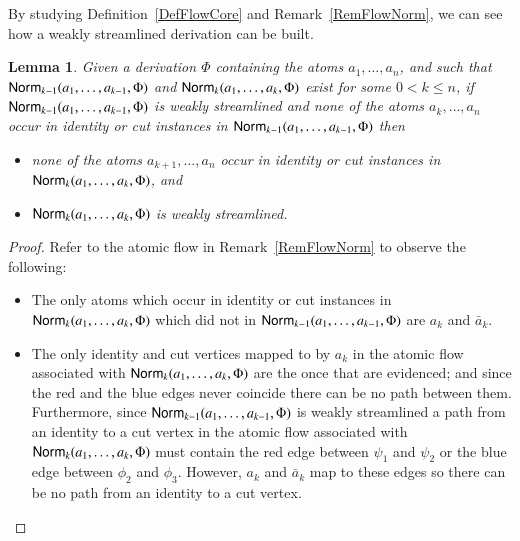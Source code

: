 \documentclass[a4paper]{amsart}
\renewcommand{\le}{\leqslant}
\newtheorem{lemma}[theorem]{Lemma}
\theoremstyle{definition}
\theoremstyle{remark}
\begin{document}

By studying Definition~\ref{DefFlowCore} and Remark~\ref{RemFlowNorm}, we can see how a weakly streamlined derivation can be built.


\begin{lemma}\label{LemStreamlinedNorm}
Given a derivation $\Phi$ containing the atoms $a_1,\dots,a_n$, and such that\/ $\mathsf{Norm}_{k-1}(a_1,\dots,a_{k-1},\Phi)$ and\/ $\mathsf{Norm}_k(a_1,\dots,a_k,\Phi)$ exist for some $0<k\le n$, if\/ $\mathsf{Norm}_{k-1}(a_1,\dots,a_{k-1},\Phi)$ is weakly streamlined and none of the atoms $a_k,\dots,a_n$ occur in identity or cut instances in\/ $\mathsf{Norm}_{k-1}(a_1,\dots,a_{k-1},\Phi)$ then
\begin{itemize}
 \item none of the atoms $a_{k+1},\dots,a_n$ occur in identity or cut instances in $\mathsf{Norm}_k(a_1,\dots,a_k,\Phi)$, and
 \item $\mathsf{Norm}_k(a_1,\dots,a_k,\Phi)$ is weakly streamlined.
\end{itemize}
\end{lemma}

\begin{proof}
Refer to the atomic flow in Remark~\ref{RemFlowNorm} to observe the following:
\begin{itemize}
 \item The only atoms which occur in identity or cut instances in $\mathsf{Norm}_k(a_1,\dots,a_k,\Phi)$ which did not in $\mathsf{Norm}_{k-1}(a_1,\dots,a_{k-1},\Phi)$ are $a_k$ and $\bar a_k$.
 \item The only identity and cut vertices mapped to by $a_k$ in the atomic flow associated with $\mathsf{Norm}_k(a_1,\dots,a_k,\Phi)$ are the once that are evidenced; and since the red and the blue edges never coincide there can be no path between them. Furthermore, since $\mathsf{Norm}_{k-1}(a_1,\dots,a_{k-1},\Phi)$ is weakly streamlined a path from an identity to a cut vertex in the atomic flow associated with $\mathsf{Norm}_k(a_1,\dots,a_k,\Phi)$ must contain the red edge between $\psi_1$ and $\psi_2$ or the blue edge between $\phi_2$ and $\phi_3$. However, $a_k$ and $\bar a_k$ map to these edges so there can be no path from an identity to a cut vertex.
\end{itemize}
\end{proof}

\end{document}
